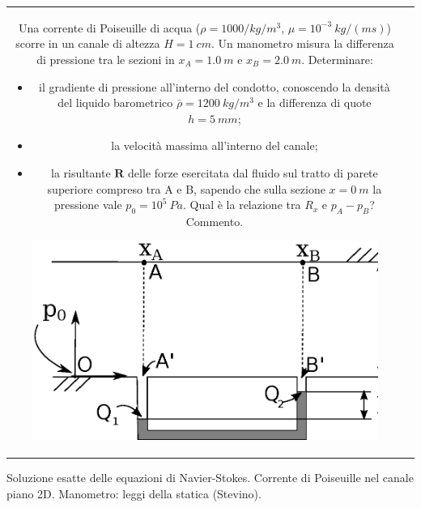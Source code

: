 \noindent
\begin{tabular}{cc}
\begin{minipage}[l]{0.50\textwidth}
 \begin{exerciseS}
 Una corrente di Poiseuille di acqua ($\rho = 1000 / kg/m^3$, $\mu = 
 10^{-3} \ kg/(m s)$) scorre in 
 un canale di altezza $H = 1 \ cm$. Un manometro misura la differenza di 
 pressione tra le sezioni in $x_A = 1.0 \ m$ e $x_B= 2.0 \ m$.
 Determinare:
 \begin{itemize}
   \item il gradiente di pressione all'interno del condotto, conoscendo la
       densità del liquido barometrico $\bar{\rho} = 1200 \ kg/m^3$ e la 
       differenza di quote $h = 5 \ mm$;
   \item la velocità massima all'interno del canale;
   \item la risultante $\bm{R}$ delle forze esercitata dal fluido sul tratto
      di parete superiore compreso tra A e B, sapendo che sulla sezione
      $x = 0 \ m$ la pressione vale $p_0 = 10^5 \ Pa$. Qual è la relazione
      tra $R_x$ e $p_A - p_B$? Commento.
 \end{itemize}
 \end{exerciseS}
\end{minipage}
\hspace{3mm}
\begin{minipage}[r]{0.50\textwidth}
   \begin{center}
   \includegraphics[width=0.90\textwidth]{./fig/manometro_Poiseuille.eps}
   \end{center}
\end{minipage}
\end{tabular}

\sol

\partone Soluzione esatte delle equazioni di Navier-Stokes. Corrente di
 Poiseuille nel canale piano 2D. Manometro: leggi della statica (Stevino).

